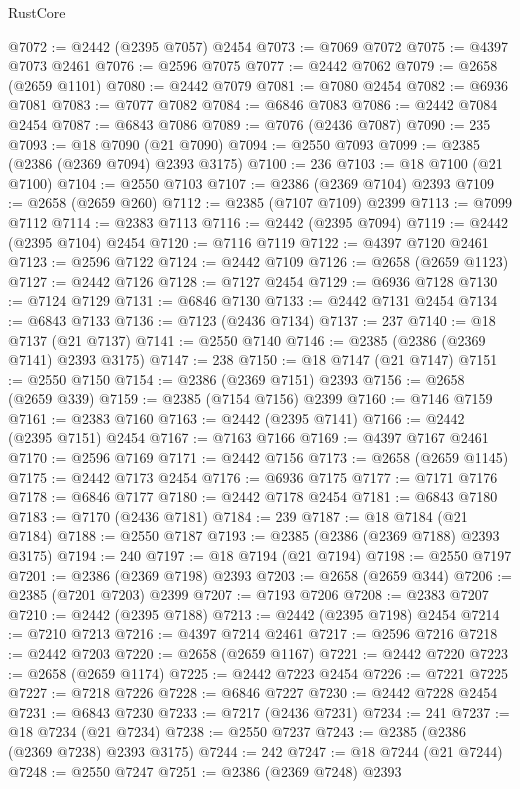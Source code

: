 \begin{lexlean}{RustCore}
\begin{coremodule}
@7072 := @2442 (@2395 @7057) @2454
@7073 := @7069 @7072
@7075 := @4397 @7073 @2461
@7076 := @2596 @7075
@7077 := @2442 @7062
@7079 := @2658 (@2659 @1101)
@7080 := @2442 @7079
@7081 := @7080 @2454
@7082 := @6936 @7081
@7083 := @7077 @7082
@7084 := @6846 @7083
@7086 := @2442 @7084 @2454
@7087 := @6843 @7086
@7089 := @7076 (@2436 @7087)
@7090 := 235
@7093 := @18 @7090 (@21 @7090)
@7094 := @2550 @7093
@7099 := @2385 (@2386 (@2369 @7094) @2393 @3175)
@7100 := 236
@7103 := @18 @7100 (@21 @7100)
@7104 := @2550 @7103
@7107 := @2386 (@2369 @7104) @2393
@7109 := @2658 (@2659 @260)
@7112 := @2385 (@7107 @7109) @2399
@7113 := @7099 @7112
@7114 := @2383 @7113
@7116 := @2442 (@2395 @7094)
@7119 := @2442 (@2395 @7104) @2454
@7120 := @7116 @7119
@7122 := @4397 @7120 @2461
@7123 := @2596 @7122
@7124 := @2442 @7109
@7126 := @2658 (@2659 @1123)
@7127 := @2442 @7126
@7128 := @7127 @2454
@7129 := @6936 @7128
@7130 := @7124 @7129
@7131 := @6846 @7130
@7133 := @2442 @7131 @2454
@7134 := @6843 @7133
@7136 := @7123 (@2436 @7134)
@7137 := 237
@7140 := @18 @7137 (@21 @7137)
@7141 := @2550 @7140
@7146 := @2385 (@2386 (@2369 @7141) @2393 @3175)
@7147 := 238
@7150 := @18 @7147 (@21 @7147)
@7151 := @2550 @7150
@7154 := @2386 (@2369 @7151) @2393
@7156 := @2658 (@2659 @339)
@7159 := @2385 (@7154 @7156) @2399
@7160 := @7146 @7159
@7161 := @2383 @7160
@7163 := @2442 (@2395 @7141)
@7166 := @2442 (@2395 @7151) @2454
@7167 := @7163 @7166
@7169 := @4397 @7167 @2461
@7170 := @2596 @7169
@7171 := @2442 @7156
@7173 := @2658 (@2659 @1145)
@7175 := @2442 @7173 @2454
@7176 := @6936 @7175
@7177 := @7171 @7176
@7178 := @6846 @7177
@7180 := @2442 @7178 @2454
@7181 := @6843 @7180
@7183 := @7170 (@2436 @7181)
@7184 := 239
@7187 := @18 @7184 (@21 @7184)
@7188 := @2550 @7187
@7193 := @2385 (@2386 (@2369 @7188) @2393 @3175)
@7194 := 240
@7197 := @18 @7194 (@21 @7194)
@7198 := @2550 @7197
@7201 := @2386 (@2369 @7198) @2393
@7203 := @2658 (@2659 @344)
@7206 := @2385 (@7201 @7203) @2399
@7207 := @7193 @7206
@7208 := @2383 @7207
@7210 := @2442 (@2395 @7188)
@7213 := @2442 (@2395 @7198) @2454
@7214 := @7210 @7213
@7216 := @4397 @7214 @2461
@7217 := @2596 @7216
@7218 := @2442 @7203
@7220 := @2658 (@2659 @1167)
@7221 := @2442 @7220
@7223 := @2658 (@2659 @1174)
@7225 := @2442 @7223 @2454
@7226 := @7221 @7225
@7227 := @7218 @7226
@7228 := @6846 @7227
@7230 := @2442 @7228 @2454
@7231 := @6843 @7230
@7233 := @7217 (@2436 @7231)
@7234 := 241
@7237 := @18 @7234 (@21 @7234)
@7238 := @2550 @7237
@7243 := @2385 (@2386 (@2369 @7238) @2393 @3175)
@7244 := 242
@7247 := @18 @7244 (@21 @7244)
@7248 := @2550 @7247
@7251 := @2386 (@2369 @7248) @2393

\end{coremodule}
\end{lexlean}
